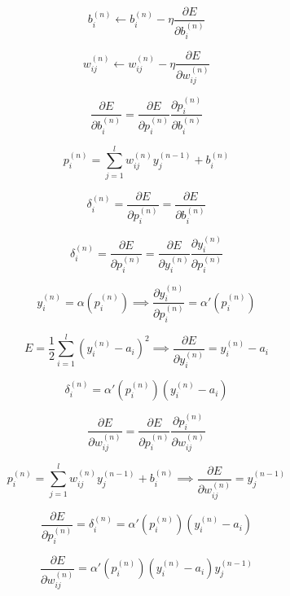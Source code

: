 \documentclass[ignorenonframetext,]{beamer}
\begin{document}
\begin{frame}{}

\[ b_i^{(n)} \longleftarrow b_i^{(n)} - \eta \frac{\partial{E}}{\partial{b_i^{(n)}}} \]

\[ w_{ij}^{(n)} \longleftarrow w_{ij}^{(n)} - \eta \frac{\partial{E}}{\partial{w_{ij}^{(n)}}} \]

\[ \frac{\partial{E}}{\partial{b_i^{(n)}}} = \frac{\partial{E}}{\partial{p_i^{(n)}}} \frac{\partial{p_i^{(n)}}}{\partial{b_i^{(n)}}} \]

\[ p_i^{(n)} = \sum_{j=1}^l w_{ij}^{(n)} y_j^{(n-1)} + b_i^{(n)} \]

\end{frame}

\begin{frame}{}

\[ \delta_i^{(n)} = \frac{\partial{E}}{\partial{p_i^{(n)}}} = \frac{\partial{E}}{\partial{b_i^{(n)}}} \]

\[ \delta_i^{(n)} = \frac{\partial{E}}{\partial{p_i^{(n)}}} = \frac{\partial{E}}{\partial{y_i^{(n)}}} \frac{\partial{y_i^{(n)}}}{\partial{p_i^{(n)}}} \]

\[ y_i^{(n)} = \alpha(p_i^{(n)}) \implies \frac{\partial{y_i^{(n)}}}{\partial{p_i^{(n)}}} = \alpha'(p_i^{(n)}) \]

\[ E = \frac{1}{2} \sum_{i=1}^l (y_i^{(n)}-a_i)^2 \implies \frac{\partial{E}}{\partial{y_i^{(n)}}} = y_i^{(n)} - a_i \]

\end{frame}

\begin{frame}{}

\[ \delta_i^{(n)} = \alpha'(p_i^{(n)}) (y_i^{(n)} - a_i) \]

\[ \frac{\partial{E}}{\partial{w_{ij}^{(n)}}} = \frac{\partial{E}}{\partial{p_i^{(n)}}} \frac{\partial{p_i^{(n)}}}{\partial{w_{ij}^{(n)}}} \]

\[ p_i^{(n)} = \sum_{j=1}^l w_{ij}^{(n)} y_j^{(n-1)} + b_i^{(n)} \implies \frac{\partial{E}}{\partial{w_{ij}^{(n)}}} = y_j^{(n-1)} \]

\[ \frac{\partial{E}}{\partial{p_i^{(n)}}} = \delta_i^{(n)} = \alpha'(p_i^{(n)}) (y_i^{(n)} - a_i) \]

\[ \frac{\partial{E}}{\partial{w_{ij}^{(n)}}} = \alpha'(p_i^{(n)}) (y_i^{(n)} - a_i) y_j^{(n-1)} \]

\end{frame}
\end{document}
